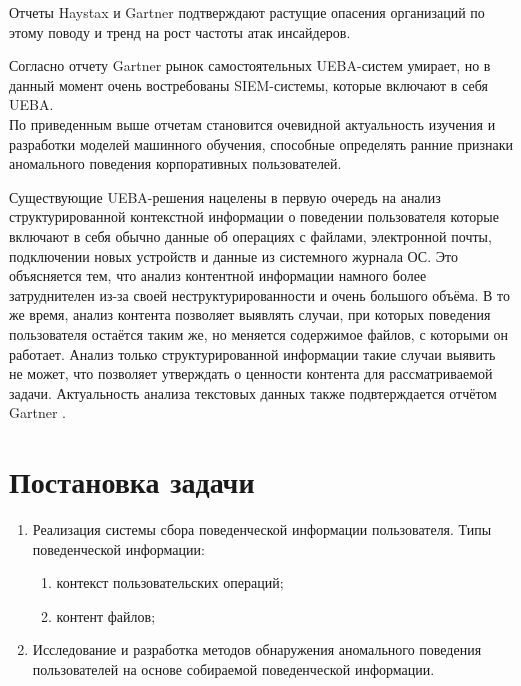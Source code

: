 Отчеты Haystax \cite{veriatoInsiderThreatReport}\cite{companyInsiderThreatReport} и Gartner \cite{EmergingInsiderThreat2018} подтверждают растущие опасения организаций по этому поводу и тренд на рост частоты атак инсайдеров.

Согласно отчету Gartner \cite{GartnerReportMarket2019} рынок самостоятельных UEBA-систем умирает, но в данный момент очень востребованы SIEM-системы, которые включают в себя UEBA.\\

По приведенным выше отчетам становится очевидной актуальность изучения и разработки моделей машинного обучения, способные определять ранние признаки аномального поведения корпоративных пользователей.

Существующие UEBA-решения нацелены в первую очередь на анализ структурированной контекстной информации о поведении пользователя которые включают в себя обычно данные об операциях с файлами, электронной почты, подключении новых устройств и данные из системного журнала ОС. Это объясняется тем, что анализ контентной информации намного более затруднителен из-за своей неструктурированности и очень большого объёма. В то же время, анализ контента позволяет выявлять случаи, при которых поведения пользователя остаётся таким же, но меняется содержимое файлов, с которыми он работает. Анализ только структурированной информации такие случаи выявить не может, что позволяет утверждать о ценности контента для рассматриваемой задачи. Актуальность анализа текстовых данных также подвтерждается отчётом Gartner \cite{GartnerReportMarket2019}.\\


\chapter{Постановка задачи}

\begin{enumerate}
	\item Реализация системы сбора поведенческой информации пользователя. Типы поведенческой информации:
	\begin{enumerate}
		\item контекст пользовательских операций;
		\item контент файлов;
	\end{enumerate}
	\item Исследование и разработка методов обнаружения аномального поведения пользователей на основе собираемой поведенческой информации.
\end{enumerate}